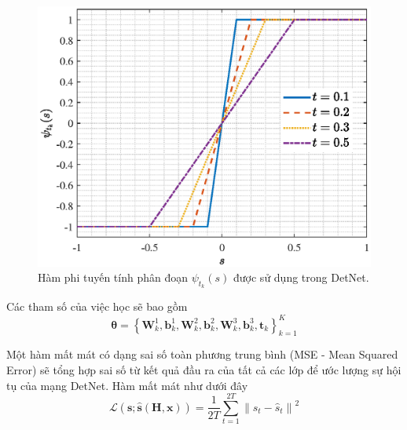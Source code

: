 \begin{figure}[ht]
    \centering
    \includegraphics[width=.8\linewidth]{figures/soft_sign.eps}
    \caption{Hàm phi tuyến tính phân đoạn $\psi_{t_k}(s)$ được sử dụng trong DetNet.}
    \label{fig:soft_sign}
\end{figure}
Các tham số của việc học sẽ bao gồm 
\begin{equation}
\boldsymbol{\theta}=\left\{\mathbf{W}^1_{k}, \mathbf{b}^1_{k}, \mathbf{W}^2_{k}, \mathbf{b}^2_{k}, \mathbf{W}^3_{k}, \mathbf{b}^3_{ k}, \mathbf{t}_k\right\}_{k=1}^K
\end{equation}

Một hàm mất mát có dạng sai số toàn phương trung bình (MSE - Mean Squared Error) sẽ tổng hợp sai số từ kết quả đầu ra của tất cả các lớp để ước lượng sự hội tụ của mạng DetNet. Hàm mất mát như dưới đây
\begin{equation}
\label{eq:lossdetnet}
    \mathcal{L}(\mathbf{s} ; \hat{\mathbf{s}}(\mathbf{H}, \mathbf{x}))= \frac{1}{2T} \sum_{t=1}^{2T} {\left\| s_t-\hat{s}_t\right\|^2}
\end{equation}

